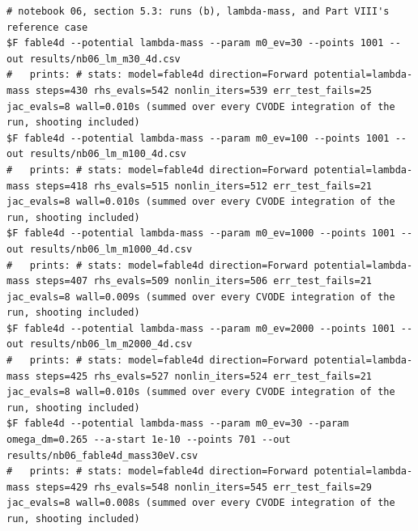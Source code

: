 \begin{Verbatim}[fontsize=\scriptsize]
# notebook 06, section 5.3: runs (b), lambda-mass, and Part VIII's reference case
$F fable4d --potential lambda-mass --param m0_ev=30 --points 1001 --out results/nb06_lm_m30_4d.csv
#   prints: # stats: model=fable4d direction=Forward potential=lambda-mass steps=430 rhs_evals=542 nonlin_iters=539 err_test_fails=25 jac_evals=8 wall=0.010s (summed over every CVODE integration of the run, shooting included)
$F fable4d --potential lambda-mass --param m0_ev=100 --points 1001 --out results/nb06_lm_m100_4d.csv
#   prints: # stats: model=fable4d direction=Forward potential=lambda-mass steps=418 rhs_evals=515 nonlin_iters=512 err_test_fails=21 jac_evals=8 wall=0.010s (summed over every CVODE integration of the run, shooting included)
$F fable4d --potential lambda-mass --param m0_ev=1000 --points 1001 --out results/nb06_lm_m1000_4d.csv
#   prints: # stats: model=fable4d direction=Forward potential=lambda-mass steps=407 rhs_evals=509 nonlin_iters=506 err_test_fails=21 jac_evals=8 wall=0.009s (summed over every CVODE integration of the run, shooting included)
$F fable4d --potential lambda-mass --param m0_ev=2000 --points 1001 --out results/nb06_lm_m2000_4d.csv
#   prints: # stats: model=fable4d direction=Forward potential=lambda-mass steps=425 rhs_evals=527 nonlin_iters=524 err_test_fails=21 jac_evals=8 wall=0.010s (summed over every CVODE integration of the run, shooting included)
$F fable4d --potential lambda-mass --param m0_ev=30 --param omega_dm=0.265 --a-start 1e-10 --points 701 --out results/nb06_fable4d_mass30eV.csv
#   prints: # stats: model=fable4d direction=Forward potential=lambda-mass steps=429 rhs_evals=548 nonlin_iters=545 err_test_fails=29 jac_evals=8 wall=0.008s (summed over every CVODE integration of the run, shooting included)
\end{Verbatim}
